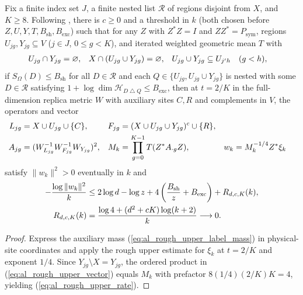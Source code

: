 \begin{lemma}
    Fix a finite index set $J$, a finite nested list $\mathcal R$ of regions
    disjoint from $X$, and $K\geq8$. Following
    \cite[Section~8, lines~130--169 and~332--381]{OpenAI2026AreaLaw}, there is
    $c\geq0$ and a threshold in $k$ (both chosen before
    $Z,U,Y,T,B_{\mathrm{sh}},B_{\mathrm{exc}}$) such that for any $Z$ with
    $Z^*Z=I$ and $ZZ^*=P_{\mathrm{sym}}$, regions $U_{jg},Y_{jg}\subseteq V$
    ($j\in J$, $0\leq g<K$), and iterated weighted geometric mean $T$ with
    \begin{align}
        U_{jg}\cap Y_{jg}        & =\varnothing,                       &
        X\cap(U_{jg}\cup Y_{jg}) & =\varnothing,                       &
        U_{jg}\cup Y_{jg}        & \subseteq U_{j'h}\quad(g<h), \notag
    \end{align}
    if $S_\Omega(D)\leq B_{\mathrm{sh}}$ for all $D\in\mathcal R$ and each
    $Q\in\{U_{jg},U_{jg}\cup Y_{jg}\}$ is nested with some $D\in\mathcal R$
    satisfying $1+\log\dim\mathcal H_{D\mathbin{\triangle} Q}\leq B_{\mathrm{exc}}$,
    then at $t=2/K$ in the full-dimension replica metric $W$ with auxiliary
    sites $C,R$ and complements in $V$, the operators and vector
    \begin{align}
        L_{jg} & =X\cup U_{jg}\cup\{C\},                               &
        F_{jg} & =(X\cup U_{jg}\cup Y_{jg})^c\cup\{R\},         \notag   \\
        A_{jg} & =(W_{L_{jg}}^{-1}W_{F_{jg}}^{-1}W_{Y_{jg}})^2,        &
        M_k    & =\prod_{g=0}^{K-1}T(Z^*A_{\cdot g}Z),                 &
        w_k    & =M_k^{-1/4}Z^*\xi_k
        \label{eq:al_rough_upper_vector}
    \end{align}
    satisfy $\|w_k\|^2>0$ eventually in $k$ and
    \begin{align}
        -\frac{\log\|w_k\|^2}{k}
         & \leq2\log d-\log z
        +4\left(\frac{B_{\mathrm{sh}}}{z}+B_{\mathrm{exc}}\right)
        +R_{d,c,K}(k),                                         \notag \\
        R_{d,c,K}(k)
         & =\frac{\log4+(d^2+cK)\log(k+2)}{k}\longrightarrow0.
        \label{eq:al_rough_upper_rate}
    \end{align}
\end{lemma}
\begin{proof}
    \leanok
    Express the auxiliary mass (\ref{eq:al_rough_upper_label_mass}) in
    physical-site coordinates and apply the rough upper estimate for $\xi_k$ at
    $t=2/K$ and exponent $1/4$. Since $Y_{jg}\setminus X=Y_{jg}$, the ordered
    product in (\ref{eq:al_rough_upper_vector}) equals $M_k$ with prefactor
    $8(1/4)(2/K)K=4$, yielding (\ref{eq:al_rough_upper_rate}).
\end{proof}

